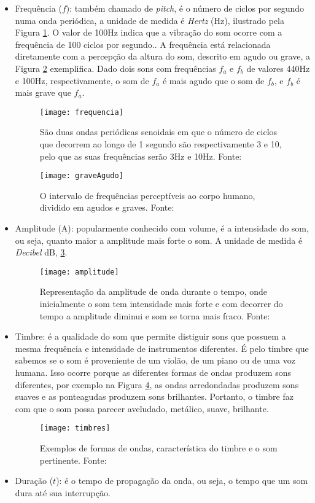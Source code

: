 \begin{itemize}
	\item Frequência ($f$): também chamado de \textit{pitch}, é o número de ciclos por segundo numa onda periódica, a unidade de medida é \textit{Hertz} (Hz), ilustrado pela Figura \ref{fig:frequencia}. O valor de 100Hz indica que a vibração do som ocorre com a frequência de 100 ciclos por segundo.\cite{Miletto2004}. A frequência está relacionada diretamente com a percepção da altura do som, descrito em agudo ou grave, a Figura \ref{fig:zonasFrequencias} exemplifica. Dado dois sons com frequências $f_{a}$ e $f_{b}$ de valores 440Hz e 100Hz, respectivamente, o som de $f_{a}$ é mais agudo que o som de $f_{b}$, e $f_{b}$ é mais grave que $f_{a}$. 
		\begin{figure}[!htb]
			\centering
			\texttt{[image: frequencia]}
			\caption{São duas ondas periódicas senoidais em que o número de ciclos que decorrem ao longo de 1 segundo são respectivamente 3 e 10, pelo que as suas frequências serão 3Hz e 10Hz. Fonte: \cite{Barbosa1999}}
			\label{fig:frequencia}
		\end{figure} 
		\begin{figure}[!htb]
			\centering
			\texttt{[image: graveAgudo]}
			\caption{O intervalo de frequências perceptíveis ao corpo humano, dividido em agudos e graves. Fonte: \cite{Barbosa1999}}
			\label{fig:zonasFrequencias}
		\end{figure}
	\item Amplitude (A): popularmente conhecido com volume, é a intensidade do som, ou seja, quanto maior a amplitude mais forte o som. A unidade de medida é \textit{Decibel} dB, \ref{fig:amplitude}.
		\begin{figure}[!htb]
			\centering
			\texttt{[image: amplitude]}
			\caption{Representação da amplitude de onda durante o tempo, onde inicialmente o som tem intensidade mais forte e com decorrer do tempo a amplitude diminui e som se torna mais fraco. Fonte: \cite{Barbosa1999}}
			\label{fig:amplitude}
		\end{figure}
	\item Timbre: é a qualidade do som que permite distiguir sons que possuem a mesma frequência e intensidade de instrumentos diferentes. É pelo timbre que sabemos se o som é proveniente de um violão, de um piano ou de uma voz humana. Isso ocorre porque as diferentes formas de ondas produzem sons diferentes, por exemplo na Figura \ref{fig:timbres}, as ondas arredondadas produzem sons suaves e as ponteagudas produzem sons brilhantes. Portanto, o timbre faz com que o som possa parecer aveludado, metálico, suave, brilhante. \cite{edgar1986}
		\begin{figure}[!htb]
			\centering
			\texttt{[image: timbres]}
			\caption{Exemplos de formas de ondas, característica do timbre e o som pertinente. Fonte: \cite{Miletto2004}}
			\label{fig:timbres}
		\end{figure}
		\item Duração ($t$): é o tempo de propagação da onda, ou seja, o tempo que um som dura até sua interrupção.
\end{itemize}

